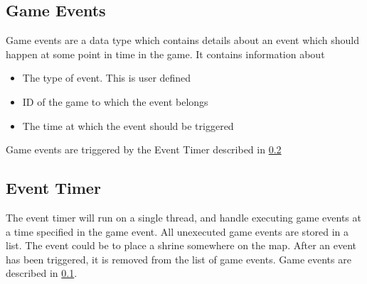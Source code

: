 \subsection{Game Events}\label{subsec:gameEvents}
Game events are a data type which contains details about an event which should happen at some point in time in the game. It contains information about

\begin{itemize}
\item The type of event. This is user defined
\item ID of the game to which the event belongs
\item The time at which the event should be triggered
\end{itemize}

Game events are triggered by the Event Timer described in \cref{subsec:eventtimerdesign}

\subsection{Event Timer}\label{subsec:eventtimerdesign}
The event timer will run on a single thread, and handle executing game events at a time specified in the game event. All unexecuted game events are stored in a list. The event could be to place a shrine somewhere on the map. After an event has been triggered, it is removed from the list of game events. Game events are described in \cref{subsec:gameEvents}.